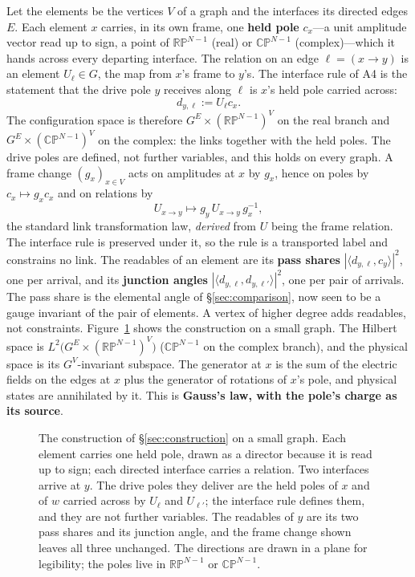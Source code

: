 \documentclass[11pt,a4paper]{article}
\theoremstyle{plain}
\theoremstyle{definition}
\theoremstyle{remark}
\newcommand{\RP}{\mathbb{RP}}
\newcommand{\CP}{\mathbb{CP}}
\begin{document}
Let the elements be the vertices $V$ of a graph and the interfaces its directed edges $E$. Each element $x$ carries, in its own frame, one \textbf{held pole} $c_x$---a unit amplitude vector read up to sign, a point of $\RP^{N-1}$ (real) or $\CP^{N-1}$ (complex)---which it hands across every departing interface. The relation on an edge $\ell=(x\to y)$ is an element $U_\ell\in G$, the map from $x$'s frame to $y$'s. The interface rule of A4 is the statement that the drive pole $y$ receives along $\ell$ is $x$'s held pole carried across:
\begin{equation}
d_{y,\ell}:=U_\ell c_x .
\end{equation}
The configuration space is therefore $G^E\times(\RP^{N-1})^V$ on the real branch and $G^E\times(\CP^{N-1})^V$ on the complex: the links together with the held poles. The drive poles are defined, not further variables, and this holds on every graph. A frame change $(g_x)_{x\in V}$ acts on amplitudes at $x$ by $g_x$, hence on poles by $c_x\mapsto g_xc_x$ and on relations by
\begin{equation}
U_{x\to y}\mapsto g_y\,U_{x\to y}\,g_x^{-1},
\end{equation}
the standard link transformation law, \emph{derived} from $U$ being the frame relation. The interface rule is preserved under it, so the rule is a transported label and constrains no link. The readables of an element are its \textbf{pass shares} $|\langle d_{y,\ell},c_y\rangle|^2$, one per arrival, and its \textbf{junction angles} $|\langle d_{y,\ell},d_{y,\ell'}\rangle|^2$, one per pair of arrivals. The pass share is the elemental angle of \S\ref{sec:comparison}, now seen to be a gauge invariant of the pair of elements. A vertex of higher degree adds readables, not constraints. Figure~\ref{fig:construction} shows the construction on a small graph. The Hilbert space is $L^2\big(G^E\times(\RP^{N-1})^V\big)$ ($\CP^{N-1}$ on the complex branch), and the physical space is its $G^V$-invariant subspace. The generator at $x$ is the sum of the electric fields on the edges at $x$ plus the generator of rotations of $x$'s pole, and physical states are annihilated by it. This is \textbf{Gauss's law, with the pole's charge as its source}.

\begin{figure}[!htbp]
\centering

\caption{The construction of \S\ref{sec:construction} on a small graph. Each element carries one held pole, drawn as a director because it is read up to sign; each directed interface carries a relation. Two interfaces arrive at $y$. The drive poles they deliver are the held poles of $x$ and of $w$ carried across by $U_\ell$ and $U_{\ell'}$; the interface rule defines them, and they are not further variables. The readables of $y$ are its two pass shares and its junction angle, and the frame change shown leaves all three unchanged. The directions are drawn in a plane for legibility; the poles live in $\RP^{N-1}$ or $\CP^{N-1}$.}
\label{fig:construction}
\end{figure}
\end{document}
